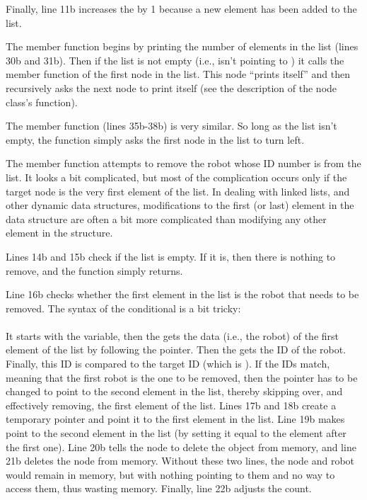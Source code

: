 Finally, line 11b increases the  by 1 because a new element has been added to the list.


The  member function begins by printing the number of elements in the list (lines 30b and 31b).  Then if the list is not empty (i.e.,  isn't pointing to ) it calls the  member function of the first node in the list.  This node ``prints itself'' and then recursively asks the next node to print itself (see the description of the node class's  function).

The  member function (lines 35b-38b) is very similar.  So long as the list isn't empty, the function simply asks the first node in the list to turn left.


The  member function attempts to remove the robot whose ID number is  from the list.  It looks a bit complicated, but most of the complication occurs only if the target node is the very first element of the list.  In dealing with linked lists, and other dynamic data structures, modifications to the first (or last) element in the data structure are often a bit more complicated than modifying any other element in the structure.

Lines 14b and 15b check if the list is empty.  If it is, then there is nothing to remove, and the function simply returns.   

Line 16b checks whether the first element in the list is the robot that needs to be removed.  The syntax of the conditional is a bit tricky:\\
 \\
  It starts with the  variable, then the  gets the data (i.e., the robot) of the first element of the list by following the  pointer.  Then the  gets the ID of the robot.  Finally, this ID is compared to the target ID (which is ).  If the IDs match, meaning that the first robot is the one to be removed, then the  pointer has to be changed to point to the second element in the list, thereby skipping over, and effectively removing, the first element of the list.  Lines 17b and 18b create a temporary pointer and point it to the first element in the list.  Line 19b makes  point to the second element in the list (by setting it equal to the element after the first one).  Line 20b tells the node to delete the  object from memory, and line 21b deletes the node from memory.  Without these two lines, the node and robot would remain in memory, but with nothing pointing to them and no way to access them, thus wasting memory.   Finally, line 22b adjusts the count.

